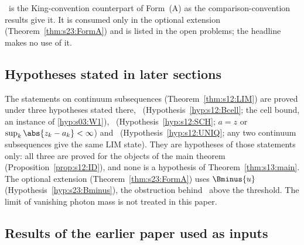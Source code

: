 \begin{remark}[on \FAK]\label{rem:s03:FAK}
\FAK\ is the King-convention counterpart of Form~(A) as the comparison-convention results give it. It is consumed only in the optional extension (Theorem~\ref{thm:s23:FormA}) and is listed in the open problems; the headline makes no use of it.
\end{remark}

\subsection{Hypotheses stated in later sections}

The statements on continuum subsequences (Theorem~\ref{thm:s12:LIM}) are proved under three hypotheses stated there, \Bcell\ (Hypothesis~\ref{hyp:s12:Bcell}; the cell bound, an instance of \cref{hyp:s03:W1}), \SCH\ (Hypothesis~\ref{hyp:s12:SCH}; $a=z$ or $\sup_k\abs{z_k-a_k}<\infty$) and \UNIQ\ (Hypothesis~\ref{hyp:s12:UNIQ}; any two continuum subsequences give the same LIM state). They are hypotheses of those statements only: all three are proved for the objects of the main theorem (Proposition~\ref{prop:s12:ID}), and none is a hypothesis of Theorem~\ref{thm:s13:main}. The optional extension (Theorem~\ref{thm:s23:FormA}) uses $\Bminus{u}$ (Hypothesis~\ref{hyp:s23:Bminus}), the obstruction behind \Wtwo\ above the threshold. The limit of vanishing photon mass is not treated in this paper.

\subsection{Results of the earlier paper used as inputs}

